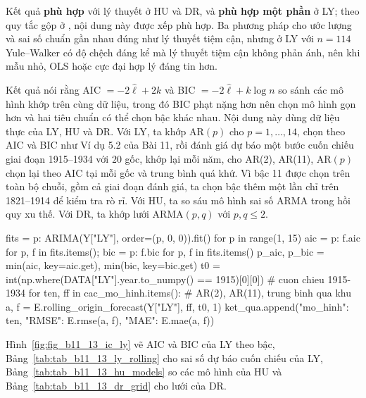  Kết quả \textbf{phù hợp} với lý thuyết ở HU và DR, và \textbf{phù hợp một phần} ở LY; theo quy tắc gộp ở , nội dung này được xếp phù hợp. Ba phương pháp cho ước lượng và sai số chuẩn gần nhau đúng như lý thuyết tiệm cận, nhưng ở LY với $n=114$ Yule--Walker có độ chệch đáng kể mà lý thuyết tiệm cận không phản ánh, nên khi mẫu nhỏ, OLS hoặc cực đại hợp lý đáng tin hơn.

 Kết quả  nói rằng AIC $=-2\hat\ell+2k$ và BIC $=-2\hat\ell+k\log n$ so sánh các mô hình khớp trên cùng dữ liệu, trong đó BIC phạt nặng hơn nên chọn mô hình gọn hơn và hai tiêu chuẩn có thể chọn bậc khác nhau.
 Nội dung này dùng dữ liệu thực của LY, HU và DR. Với LY, ta khớp AR$(p)$ cho $p=1,\dots,14$, chọn theo AIC và BIC như Ví dụ 5.2 của Bài 11, rồi đánh giá dự báo một bước cuốn chiếu giai đoạn 1915--1934 với $20$ gốc, khớp lại mỗi năm, cho AR(2), AR(11), AR$(p)$ chọn lại theo AIC tại mỗi gốc và trung bình quá khứ. Vì bậc 11 được chọn trên toàn bộ chuỗi, gồm cả giai đoạn đánh giá, ta chọn bậc thêm một lần chỉ trên 1821--1914 để kiểm tra rò rỉ. Với HU, ta so sáu mô hình sai số ARMA trong hồi quy xu thế. Với DR, ta khớp lưới ARMA$(p,q)$ với $p,q\le2$.
\begin{codeblock}
fits = {p: ARIMA(Y["LY"], order=(p, 0, 0)).fit() for p in range(1, 15)}
aic = {p: f.aic for p, f in fits.items()}; bic = {p: f.bic for p, f in fits.items()}
p_aic, p_bic = min(aic, key=aic.get), min(bic, key=bic.get)
t0 = int(np.where(DATA["LY"].year.to_numpy() == 1915)[0][0])      # cuon chieu 1915-1934
for ten, ff in cac_mo_hinh.items():           # AR(2), AR(11), trung binh qua khu
    a, f = E.rolling_origin_forecast(Y["LY"], ff, t0, 1)
    ket_qua.append({"mo_hinh": ten, "RMSE": E.rmse(a, f), "MAE": E.mae(a, f)})
\end{codeblock}
 Hình~\ref{fig:fig_b11_13_ic_ly} vẽ AIC và BIC của LY theo bậc, Bảng~\ref{tab:tab_b11_13_ly_rolling} cho sai số dự báo cuốn chiếu của LY, Bảng~\ref{tab:tab_b11_13_hu_models} so các mô hình của HU và Bảng~\ref{tab:tab_b11_13_dr_grid} cho lưới của DR.



